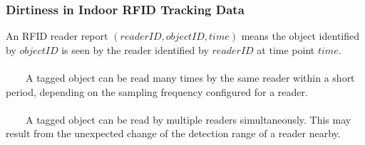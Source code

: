 
\begin{frame}
\frametitle{Dirtiness in Indoor RFID Tracking Data}

\textrm{An RFID reader report $(readerID, objectID, time)$ means the object identified by $objectID$ is seen by the reader identified by $readerID$ at time point $time$}.\\~\\

~~~~A tagged object can be read many times by the same reader within a short period, depending on the sampling frequency configured for a reader.\\~\\

~~~~A tagged object can be read by multiple readers simultaneously. This may result from the unexpected change of the detection range of a reader nearby.

\end{frame}


